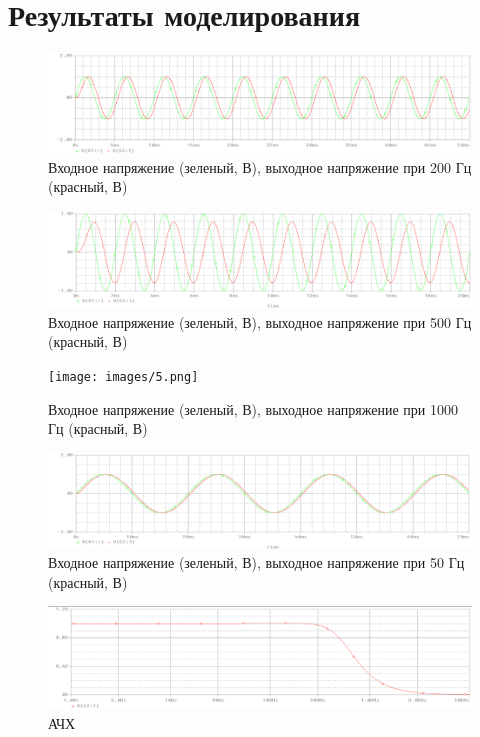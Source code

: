 \chapter{Результаты моделирования}

\begin{figure}[h!]
	\centering
	\caption{Входное напряжение (зеленый, В), выходное напряжение при 200 Гц (красный, В) }
	\includegraphics{images/3.png}
\end{figure}

\begin{figure}[h!]
	\centering
	\caption{Входное напряжение (зеленый, В), выходное напряжение при 500 Гц (красный, В)}
	\includegraphics{images/4.png}
\end{figure}

\begin{figure}[h!]
	\centering
	\caption{Входное напряжение (зеленый, В), выходное напряжение при 1000 Гц (красный, В)}
	\texttt{[image: images/5.png]}
\end{figure}

\begin{figure}[h!]
	\centering
	\caption{Входное напряжение (зеленый, В), выходное напряжение при 50 Гц (красный, В)}
	\includegraphics{images/6.png}
\end{figure}

\begin{figure}[h!]
	\centering
	\caption{АЧХ}
	\includegraphics{images/7.png}
\end{figure}


